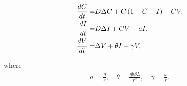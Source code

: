 \documentclass[11pt]{article}
\theoremstyle{definition}
\begin{document}
 \begin{align}
\label{eqn:immune}
\notag
\frac{dC}{dt}=&D \Delta C+{C}\left(1-C-I\right)- {C}{V},\\ \notag
\frac{dI}{dt}=& D \Delta I+CV- a I,\\
\frac{dV}{dt}=& \Delta V+\theta I-\gamma V,
\end{align}

where 
\begin{align*}
 a= \frac{\eta}{r},\quad \theta= \frac{\eta b \beta L }{r^2},\quad \gamma= \frac{\omega}{r}.\end{align*}



\end{document}
